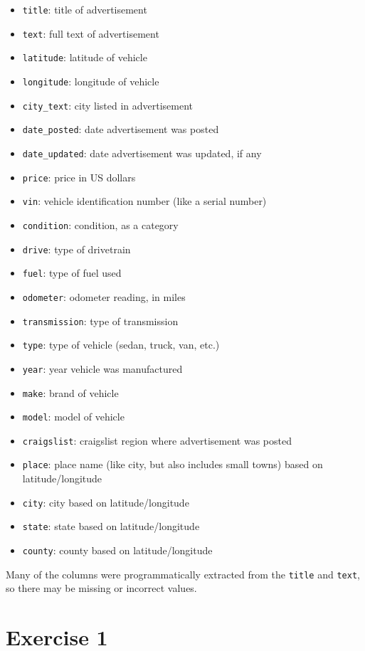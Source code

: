 \documentclass[
]{article}
\providecommand{\tightlist}{%
  \setlength{\itemsep}{0pt}\setlength{\parskip}{0pt}}
\begin{document}
\begin{itemize}
\tightlist
\item
  \texttt{title}: title of advertisement
\item
  \texttt{text}: full text of advertisement
\item
  \texttt{latitude}: latitude of vehicle
\item
  \texttt{longitude}: longitude of vehicle
\item
  \texttt{city\_text}: city listed in advertisement
\item
  \texttt{date\_posted}: date advertisement was posted
\item
  \texttt{date\_updated}: date advertisement was updated, if any
\item
  \texttt{price}: price in US dollars
\item
  \texttt{vin}: vehicle identification number (like a serial number)
\item
  \texttt{condition}: condition, as a category
\item
  \texttt{drive}: type of drivetrain
\item
  \texttt{fuel}: type of fuel used
\item
  \texttt{odometer}: odometer reading, in miles
\item
  \texttt{transmission}: type of transmission
\item
  \texttt{type}: type of vehicle (sedan, truck, van, etc.)
\item
  \texttt{year}: year vehicle was manufactured
\item
  \texttt{make}: brand of vehicle
\item
  \texttt{model}: model of vehicle
\item
  \texttt{craigslist}: craigslist region where advertisement was posted
\item
  \texttt{place}: place name (like city, but also includes small towns)
  based on latitude/longitude
\item
  \texttt{city}: city based on latitude/longitude
\item
  \texttt{state}: state based on latitude/longitude
\item
  \texttt{county}: county based on latitude/longitude
\end{itemize}

Many of the columns were programmatically extracted from the
\texttt{title} and \texttt{text}, so there may be missing or incorrect
values.

\hypertarget{exercise-1}{%
\section{Exercise 1}\label{exercise-1}}
\end{document}
